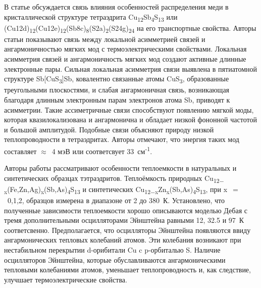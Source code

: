 В статье \cite{Lai_2015} обсуждается связь влияния особенностей распределения меди в кристаллической структуре тетраэдрита Cu\textsubscript{12}Sb\textsubscript{4}S\textsubscript{13} или (Cu12d)\textsubscript{12}(Cu12e)\textsubscript{12}(Sb8c)\textsubscript{8}(S2a)\textsubscript{2}(S24g)\textsubscript{24} на его транспортные свойства. Авторы статьи показывают связь между локальной асимметрией связей и ангармоничностью мягких мод с термоэлектрическими свойствами.  Локальная асимметрия связей и ангармоничность мягких мод создают активные длинные электронные пары. Сильная локальная асимметрия связи выявлена в пятиатомной структуре Sb[CuS\textsubscript{3}]Sb, ковалентно связанные атомы CuS\textsubscript{3}, образованные треугольными плоскостями, и слабая ангармоничная связь, возникающая благодаря длинным электронным парам электронов атома Sb, приводят к асимметрии. Такие ассиметричные связи способствуют появлению мягкой моды, которая квазилокализована и ангармонична и обладает низкой фононной частотой и большой амплитудой. Подобные связи объясняют природу низкой теплопроводности в тетраэдритах. Авторы отмечают, что энергия таких мод составляет $\approx$~4 мэВ или соответсвует 33~см\textsuperscript{-1}.

Авторы работы \cite{Lara-Curzio2014} рассматривают особенности теплоемкости в натуральных и синтетических образцах тэтраэдритов. Теплоёмкость природных  Cu\textsubscript{12$-$x}(Fe,Zn,Ag)\textsubscript{x}(Sb,As)\textsubscript{4}S\textsubscript{13} и синтетических Cu\textsubscript{12$-$x}Zn\textsubscript{x}(Sb,As)\textsubscript{4}S\textsubscript{13}, при x~$=$~0,1,2, образцов измерена в диапазоне от 2 до 380~К. Установлено, что полученные зависимости теплоемкости хорошо описываются моделью Дебая с тремя дополнительными осцилляторами Эйнштейна равными 12, 32.5 и 97~К соответсвенно. Предполагается, что осцилляторы Эйнштейна появляются ввиду ангармонических тепловых колебаний атомов. Эти колебания возникают при нестабильном перекрытии d-орибитали Cu c p-орбиталью S.
Наличие осцилляторов Эйнштейна, которые обуславливаются ангармоническими тепловыми колебаниями атомов, уменьшает теплопроводность и, как следствие, улучшает термоэлектрические свойства.


